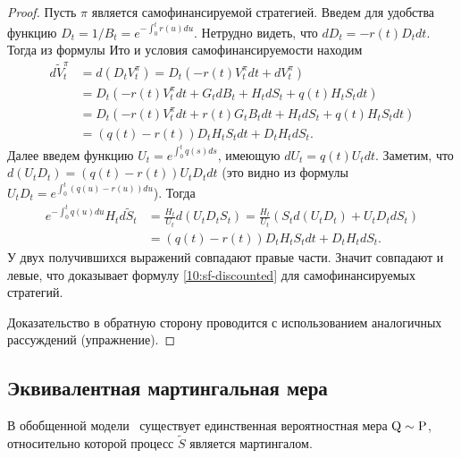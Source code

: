 \begin{proof}
Пусть $\pi$ является самофинансируемой стратегией.
Введем для удобства функцию $D_t = 1/B_t = e^{-\int_0^t r(u)du}$.
Нетрудно видеть, что $dD_t = -r(t) D_t dt$.
Тогда из формулы Ито и условия самофинансируемости находим
\begin{align*}
d \tilde V_t^\pi &= d(D_t V_t^\pi) = D_t(-r(t) V_t^\pi dt + dV_t^\pi) \\
&= D_t (-r(t)V_t^\pi dt + G_tdB_t + H_t d S_t + q(t)H_tS_tdt) \\
&= D_t (-r(t)V_t^\pi dt +r(t)  G_t B_tdt + H_t d S_t + q(t)H_tS_tdt)\\
&= (q(t)-r(t))D_t H_tS_t dt + D_t H_t dS_t.
\end{align*}
Далее введем функцию $U_t = e^{\int_0^t q(s) ds}$, имеющую $dU_t = q(t) U_t dt$.
Заметим, что $d(U_tD_t) = (q(t)-r(t))U_t D_t dt$ (это видно из формулы $U_tD_t = e^{\int_0^t (q(u)-r(u))du}$).
Тогда
\begin{align*}
e^{-\int_0^t q(u)du} H_t d \tilde S_t &= \frac{H_t}{U_t} d(U_tD_tS_t) 
  = \frac{H_t}{U_t} (S_t d(U_tD_t) + U_tD_t dS_t) \\
&= (q(t)-r(t))D_t H_tS_t dt + D_t H_t dS_t. 
\end{align*}
У двух получившихся выражений совпадают правые части.
Значит совпадают и левые, что доказывает формулу \eqref{10:sf-discounted} для самофинансируемых стратегий.

Доказательство в обратную сторону проводится с использованием аналогичных рассуждений (упражнение).
\end{proof}


\subsection{Эквивалентная мартингальная мера}

\begin{theorem}
\label{10:t:emm}
В обобщенной модели \bs\ существует единственная вероятностная мера $\mathrm{Q}\sim\mathrm{P}$, относительно которой процесс $\tilde S$ является мартингалом.
\end{theorem}

